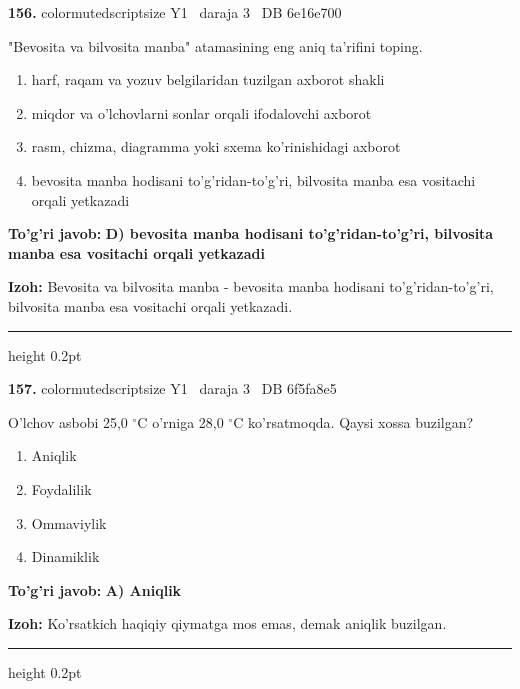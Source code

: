 \documentclass[10pt,a4paper,oneside]{article}
\begin{document}
\noindent\textbf{\color{ink}156.}  {color{muted}scriptsize Y1 \textbullet\ daraja 3 \textbullet\ DB 6e16e700}
\par
"Bevosita va bilvosita manba" atamasining eng aniq ta'rifini toping.
\begin{enumerate}[label=\Alph*),leftmargin=9mm]
\item harf, raqam va yozuv belgilaridan tuzilgan axborot shakli
\item miqdor va o'lchovlarni sonlar orqali ifodalovchi axborot
\item rasm, chizma, diagramma yoki sxema ko'rinishidagi axborot
\item bevosita manba hodisani to'g'ridan-to'g'ri, bilvosita manba esa vositachi orqali yetkazadi
\end{enumerate}
\begin{tcolorbox}[enhanced,breakable,colback=teal!4,colframe=teal!50!black,boxrule=0.5pt,arc=1.1mm,left=3mm,right=3mm,top=1.7mm,bottom=1.7mm,before skip=2mm,after skip=2mm]
\textbf{\color{teal}To'g'ri javob:} \textbf{D) bevosita manba hodisani to'g'ridan-to'g'ri, bilvosita manba esa vositachi orqali yetkazadi}
\par\smallskip
\textbf{Izoh:} Bevosita va bilvosita manba - bevosita manba hodisani to'g'ridan-to'g'ri, bilvosita manba esa vositachi orqali yetkazadi.
\end{tcolorbox}
\vspace{2mm}\hrule height 0.2pt \vspace{3mm}

\noindent\textbf{\color{ink}157.}  {color{muted}scriptsize Y1 \textbullet\ daraja 3 \textbullet\ DB 6f5fa8e5}
\par
O'lchov asbobi 25,0 \ensuremath{^\circ}C o'rniga 28,0 \ensuremath{^\circ}C ko'rsatmoqda. Qaysi xossa buzilgan?
\begin{enumerate}[label=\Alph*),leftmargin=9mm]
\item Aniqlik
\item Foydalilik
\item Ommaviylik
\item Dinamiklik
\end{enumerate}
\begin{tcolorbox}[enhanced,breakable,colback=teal!4,colframe=teal!50!black,boxrule=0.5pt,arc=1.1mm,left=3mm,right=3mm,top=1.7mm,bottom=1.7mm,before skip=2mm,after skip=2mm]
\textbf{\color{teal}To'g'ri javob:} \textbf{A) Aniqlik}
\par\smallskip
\textbf{Izoh:} Ko'rsatkich haqiqiy qiymatga mos emas, demak aniqlik buzilgan.
\end{tcolorbox}
\vspace{2mm}\hrule height 0.2pt \vspace{3mm}
\end{document}
